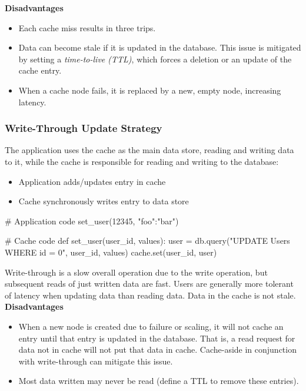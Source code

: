 \documentclass[12pt, titlepage]{article}
\begin{document}
\textbf{Disadvantages}
\begin{itemize}
  \item Each cache miss results in three trips.
  \item Data can become stale if it is updated in the database. This issue is mitigated by setting a \textit{time-to-live (TTL)}, which forces a deletion or an update of the cache entry.
  \item When a cache node fails, it is replaced by a new, empty node, increasing latency.
\end{itemize}

\subsubsection{Write-Through Update Strategy}

The application uses the cache as the main data store, reading and writing data to it, while the cache is responsible for reading and writing to the database:

\begin{itemize}
  \item Application adds/updates entry in cache
  \item Cache synchronously writes entry to data store
\end{itemize}

\begin{python}
# Application code
set_user(12345, {"foo":"bar"})
\end{python}

\begin{python}
# Cache code
def set_user(user_id, values):
    user = db.query("UPDATE Users WHERE id = {0}", user_id, values)
    cache.set(user_id, user)
\end{python}

Write-through is a slow overall operation due to the write operation, but subsequent reads of just written data are fast. Users are generally more tolerant of latency when updating data than reading data. Data in the cache is not stale. \\

\textbf{Disadvantages}
\begin{itemize}
  \item When a new node is created due to failure or scaling, it will not cache an entry until that entry is updated in the database. That is, a read request for data not in cache will not put that data in cache. Cache-aside in conjunction with write-through can mitigate this issue.
  \item Most data written may never be read (define a TTL to remove these entries).
\end{itemize}
\end{document}
